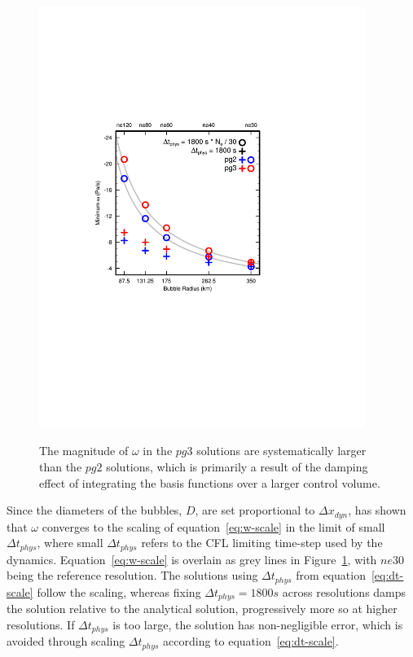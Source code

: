 \documentclass{agujournal}
\begin{document}
\begin{figure}[t]
\begin{center}
\noindent\includegraphics[width=25pc,angle=0]{figs/bubble_test.pdf}\\
\end{center}
\caption{The magnitude of $\omega$ in the $pg3$ solutions are systematically larger than the $pg2$ solutions, which is primarily a result of the damping effect of integrating the basis functions over a larger control volume.}
\label{fig:bubble}
\end{figure}

Since the diameters of the bubbles, $D$, are set proportional to $\Delta x_{dyn}$, \cite{HR2018JAMES} has shown that $\omega$ converges to the scaling of equation~\ref{eq:w-scale} in the limit of small $\Delta t_{phys}$, where small $\Delta t_{phys}$ refers to the CFL limiting time-step used by the dynamics. Equation~\ref{eq:w-scale} is overlain as grey lines in Figure~\ref{fig:bubble}, with $ne30$ being the reference resolution. The solutions using $\Delta t_{phys}$ from equation~\ref{eq:dt-scale} follow the scaling, whereas fixing $\Delta t_{phys} = 1800s$ across resolutions damps the solution relative to the analytical solution, progressively more so at higher resolutions. If $\Delta t_{phys}$ is too large, the solution has non-negligible error, which is avoided through scaling $\Delta t_{phys}$ according to equation~\ref{eq:dt-scale}.
\end{document}
